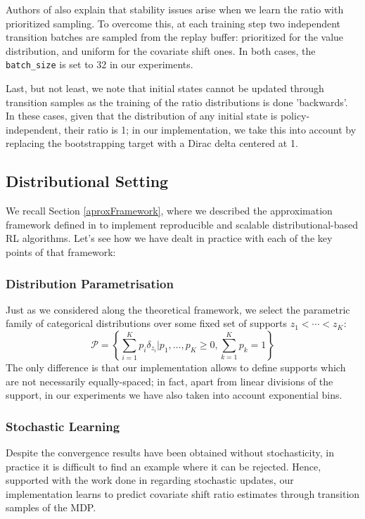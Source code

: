 \documentclass[12pt,a4paper,openright,twoside]{article}
\numberwithin{equation}{section}
\theoremstyle{definition}
\theoremstyle{remark}
\theoremstyle{plain}
\begin{document}
Authors of \cite{DCOPTD} also explain that stability issues arise when we learn the ratio with prioritized sampling. To overcome this, at each training step two independent transition batches are sampled from the replay buffer: prioritized for the value distribution, and uniform for the covariate shift ones. In both cases, the \texttt{batch\_size} is set to 32 in our experiments.

Last, but not least, we note that initial states cannot be updated through transition samples as the training of the ratio distributions is done 'backwards'. In these cases, given that the distribution of any initial state is policy-independent, their ratio is 1; in our implementation, we take this into account by replacing the bootstrapping target with a Dirac delta centered at 1.



\subsection{Distributional Setting}

We recall Section \ref{aproxFramework}, where we described the approximation framework defined in \cite{analysisC51} to implement reproducible and scalable distributional-based RL algorithms. Let's see how we have dealt in practice with each of the key points of that framework:

\subsubsection*{Distribution Parametrisation}
Just as we considered along the theoretical framework, we select the parametric family of categorical distributions over some fixed set of supports $z_1 < \cdots < z_K$:
\begin{equation*}
	\mathcal{P} = \left\{ \sum_{i=1}^{K} p_i \delta_{z_i} \Big| p_1, \dots , p_K \geq 0, \sum_{k=1}^{K} p_k = 1 \right\}
\end{equation*}
The only difference is that our implementation allows to define supports which are not necessarily equally-spaced; in fact, apart from linear divisions of the support, in our experiments we have also taken into account exponential bins.


\subsubsection*{Stochastic Learning}
Despite the convergence results have been obtained without stochasticity, in practice it is difficult to find an example where it can be rejected. Hence, supported with the work done in \cite{analysisC51, DRLlinear} regarding stochastic updates, our implementation learns to predict covariate shift ratio estimates through transition samples of the MDP.
\end{document}
